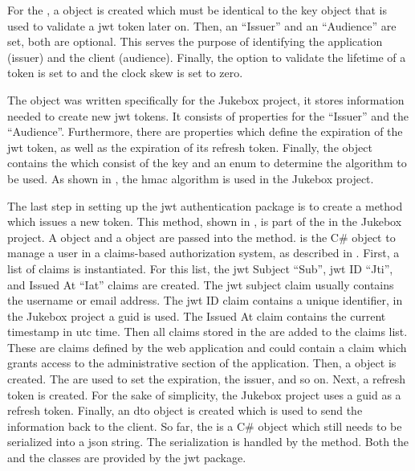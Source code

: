 For the , a  object is created which must be identical to the key object that is used to validate a \gls{jwt} token later on. Then, an \enquote{Issuer} and an \enquote{Audience} are set, both are optional. This serves the purpose of identifying the application (issuer) and the client (audience). Finally, the option to validate the lifetime of a token is set to  and the clock skew is set to zero. \cite{jwtTokenAuth}


The  object was written specifically for the Jukebox project, it stores information needed to create new \gls{jwt} tokens. It consists of properties for the \enquote{Issuer} and the \enquote{Audience}. Furthermore, there are properties which define the expiration of the \gls{jwt} token, as well as the expiration of its refresh token. Finally, the  object contains the  which consist of the key and an enum to determine the algorithm to be used. As shown in , the \gls{hmac} algorithm is used in the Jukebox project.


The last step in setting up the \gls{jwt} authentication package is to create a method which issues a new token. This method, shown in , is part of the  in the Jukebox project. A  object and a  object are passed into the method.  is the C\# object to manage a user in a claims-based authorization system, as described in . First, a list of claims is instantiated. For this list, the \gls{jwt} Subject \enquote{Sub}, \gls{jwt} ID \enquote{Jti}, and Issued At \enquote{Iat} claims are created. The \gls{jwt} subject claim usually contains the username or email address. The \gls{jwt} ID claim contains a unique identifier, in the Jukebox project a \gls{guid} is used. The Issued At claim contains the current timestamp in \gls{utc} time. Then all claims stored in the  are added to the claims list. These are claims defined by the web application and could contain a claim which grants access to the administrative section of the application. Then, a  object is created. The  are used to set the expiration, the issuer, and so on. Next, a refresh token is created. For the sake of simplicity, the Jukebox project uses a \gls{guid} as a refresh token. Finally, an  \gls{dto} object is created which is used to send the information back to the client. So far, the  is a C\# object which still needs to be serialized into a \gls{json} string. The serialization is handled by the  method. Both the  and the  classes are provided by the \gls{jwt} package.



